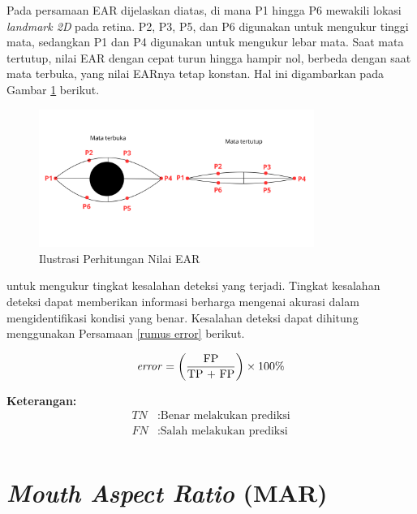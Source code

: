    Pada persamaan EAR dijelaskan diatas, di mana P1 hingga P6 mewakili lokasi \textit{landmark 2D} pada retina. P2, P3, P5, dan P6 digunakan untuk mengukur tinggi mata, sedangkan P1 dan P4 digunakan untuk mengukur lebar mata. Saat mata tertutup, nilai EAR dengan cepat turun hingga hampir nol, berbeda dengan saat mata terbuka, yang nilai EARnya tetap konstan. Hal ini digambarkan pada Gambar \ref{Ilustrasi Perhitungan Nilai EAR} berikut.

    \begin{figure}[H]
      \centering
      \includegraphics[width=0.8\textwidth]{figures/bab2/EAR.png}
      \caption{Ilustrasi Perhitungan Nilai EAR}
      \label{Ilustrasi Perhitungan Nilai EAR}
    \end{figure}
    
     untuk mengukur tingkat kesalahan deteksi yang terjadi. Tingkat kesalahan deteksi dapat memberikan informasi berharga mengenai akurasi dalam mengidentifikasi kondisi yang benar. Kesalahan deteksi dapat dihitung menggunakan Persamaan \ref{rumus error} berikut.


    \begin{equation}
        \label{rumus error}
        \begin{aligned}
        \text{\textit{error}} = \left(\frac{\text{FP}}{\text{TP + FP}}\right) \times 100\%
        \end{aligned}
    \end{equation}

       \textbf{Keterangan:}
      \begin{align*}
        TN & : \text{Benar melakukan prediksi} \\
        FN & : \text{Salah melakukan prediksi} \\
    \end{align*}

   

\section{\textit{Mouth Aspect Ratio} (MAR)}

